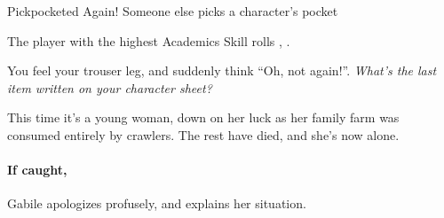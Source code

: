 
{Pickpocketed Again!}%
{Someone else picks a character's pocket}%

The player with the highest Academics Skill rolls , \tn[8].

\begin{boxtext}
  You feel your trouser leg, and suddenly think ``Oh, not again!''.  \textit{What's the last item written on your character sheet?}
\end{boxtext}

This time it's a young woman, down on her luck as her family farm was consumed entirely by \glspl{crawler}.
The rest have died, and she's now alone.

\paragraph{If caught,}
Gabile apologizes profusely, and explains her situation.


